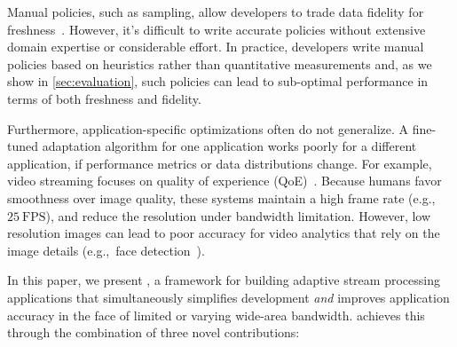 Manual policies, such as sampling, allow developers to trade data fidelity for
freshness~\cite{rabkin2014aggregation}. However, it's difficult to write
accurate policies without extensive domain expertise or considerable effort. In
practice, developers write manual policies based on heuristics rather than
quantitative measurements and, as we show in \autoref{sec:evaluation}, such
policies can lead to sub-optimal performance in terms of both freshness and
fidelity.

Furthermore, application-specific optimizations often do not generalize. A
fine-tuned adaptation algorithm for one application works poorly for a different
application, if performance metrics or data distributions change.  For example,
video streaming focuses on quality of experience
(QoE)~\cite{michalos2012dynamic, pantos2016http, yin2015control}. Because humans
favor smoothness over image quality, these systems maintain a high frame rate
(e.g.,~\(25~\text{FPS}\)), and reduce the resolution under bandwidth limitation.
However, low resolution images can lead to poor accuracy for video analytics
that rely on the image details (e.g.,~face detection~\cite{viola2001rapid}).

In this paper, we present \sysname{}, a framework for building adaptive stream
processing applications that simultaneously simplifies development \emph{and}
improves application accuracy in the face of limited or varying wide-area
bandwidth.
\sysname{} achieves this through the combination of three novel contributions:

